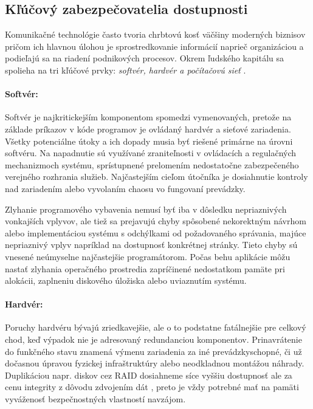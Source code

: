 \documentclass[12pt, a4paper]{article}
\begin{document}
\subsection{Kľúčový zabezpečovatelia dostupnosti}
Komunikačné technológie často tvoria chrbtovú kosť väčšiny moderných biznisov pričom ich hlavnou úlohou je 
sprostredkovanie informácií naprieč organizáciou a podieľajú sa na riadení podnikových procesov. Okrem 
ľudského kapitálu sa spolieha na tri kľúčové prvky: \emph{softvér, hardvér a počítačovú sieť} 
\cite{availability}. 

\paragraph{Softvér:}
Softvér je najkritickejším komponentom spomedzi vymenovaných, pretože na základe príkazov v kóde programov 
je ovládaný hardvér a sieťové zariadenia. Všetky potenciálne útoky a ich dopady musia byť riešené primárne 
na úrovni softvéru. Na napadnutie sú využívané zraniteľnosti v ovládacích a regulačných mechanizmoch 
systému, sprístupnené prelomením nedostatočne zabezpečeného verejného rozhrania služieb. Najčastejším cieľom 
útočníka je dosiahnutie kontroly nad zariadením alebo vyvolaním chaosu vo fungovaní prevádzky. 
 
Zlyhanie programového vybavenia nemusí byť iba v dôsledku nepriaznivých vonkajších vplyvov, ale tiež sa 
prejavujú chyby spôsobené nekorektným návrhom alebo implementáciou systému s odchýlkami od
požadovaného správania, majúce nepriaznivý vplyv napríklad na dostupnosť konkrétnej stránky. Tieto chyby sú 
vnesené neúmyselne najčastejšie programátorom. Počas behu aplikácie môžu nastať zlyhania operačného 
prostredia zapríčinené nedostatkom pamäte pri alokácii, zaplneniu diskového úložiska alebo uviaznutím 
systému. 

\paragraph{Hardvér:}
Poruchy hardvéru bývajú zriedkavejšie, ale o to podstatne fatálnejšie pre celkový chod, keď
výpadok nie je adresovaný redundanciou komponentov. Prinavrátenie do funkčného stavu znamená výmenu
zariadenia za iné prevádzkyschopné, či už dočasnou úpravou fyzickej infraštruktúry alebo neodkladnou 
montážou náhrady. Duplikáciou napr. diskov cez RAID dosiahneme síce vyššiu dostupnosť ale za cenu integrity 
z dôvodu zdvojením dát \cite{availability}, preto je vždy potrebné mať na pamäti vyváženosť bezpečnostných 
vlastností navzájom.
\end{document}
